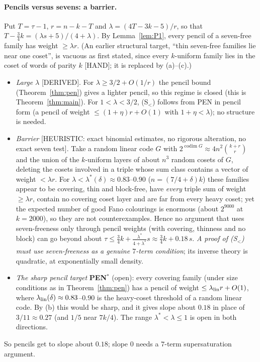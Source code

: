 \documentclass[11pt]{article}
\theoremstyle{definition}
\newcommand{\st}[1]{\textsf{\small[#1]}}
\newcommand{\codim}{\operatorname{codim}}
\begin{document}
\paragraph{Pencils versus sevens: a barrier.} Put $T=\tau-1$, $r=n-k-T$ and $\lambda=(4T-3k-5)/r$, so that
$T-\tfrac34k=(\lambda s+5)/(4+\lambda)$. By Lemma~\ref{lem:P1}, every pencil of a seven-free family has weight
$\ge\lambda r$. (An earlier structural target, ``thin seven-free families lie near one coset'', is vacuous as first
stated, since every $k$-uniform family lies in the coset of words of parity $k$ \st{HAND}; it is replaced by (a)--(c).)
\begin{itemize}[leftmargin=*]
\item[(a)] \emph{Large $\lambda$} \st{DERIVED}. For $\lambda\ge3/2+O(1/r)$ the pencil bound (Theorem~\ref{thm:pen}) gives a
lighter pencil, so this regime is closed (this is Theorem~\ref{thm:main}). For $1<\lambda<3/2$, (S$_<$) follows from
PEN in pencil form (a pencil of weight $\le(1+\eta)r+O(1)$ with $1+\eta<\lambda$); no structure is needed.
\item[(b)] \emph{Barrier} \st{HEURISTIC: exact binomial estimates, no rigorous alteration, no exact seven test}. Take a
random linear code $G$ with $2^{\codim G}\approx4n^2\binom{k+r}{r}$ and the union of the $k$-uniform layers of about
$n^3$ random cosets of $G$, deleting the cosets involved in a triple whose sum class contains a vector of weight
$<\lambda r$. For $\lambda<\lambda^*(\delta)\approx0.83$--$0.90$ ($n=(7/4+\delta)k$) these families appear to be
covering, thin and block-free, have \emph{every} triple sum of weight $\ge\lambda r$, contain no covering coset layer and
are far from every heavy coset; yet the expected number of good Fano colourings is enormous (about $2^{9000}$ at
$k=2000$), so they are not counterexamples. Hence no argument that uses seven-freeness only through pencil weights
(with covering, thinness and no block) can go beyond about
$\tau\le\tfrac34k+\tfrac{\lambda^*}{4+\lambda^*}s\approx\tfrac34k+0.18\,s$. \emph{A proof of (S$_<$) must use
seven-freeness as a genuine $7$-term condition}; its inverse theory is quadratic, at exponentially small density.
\item[(c)] \emph{The sharp pencil target} \textbf{PEN$^*$} (open): every covering family (under size conditions as in
Theorem~\ref{thm:pen}) has a pencil of weight $\le\lambda_{\rm lin}r+O(1)$, where $\lambda_{\rm lin}(\delta)\approx
0.83$--$0.90$ is the heavy-coset threshold of a random linear code. By (b) this would be sharp, and it gives slope
about $0.18$ in place of $3/11\approx0.27$ (and $1/5$ near $7k/4$). The range $\lambda^*<\lambda\le1$ is open in both directions.
\end{itemize}
So pencils get to slope about $0.18$; slope $0$ needs a $7$-term supersaturation argument.
\end{document}
